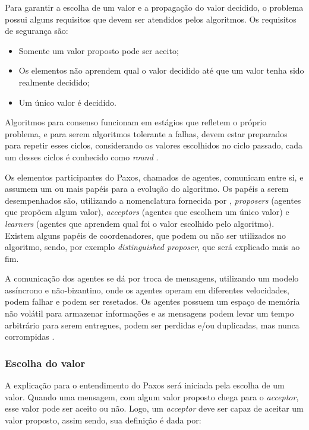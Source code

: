 \documentclass[
    12pt,
    openright, 
    oneside,
    a4paper,
    french,
    english,
    brazil
    ]{facom-ufu-abntex2}
\theoremstyle{definition}
\begin{document}
Para garantir a escolha de um valor e a propagação do valor decidido, o problema
possui alguns requisitos que devem ser atendidos pelos algoritmos. Os requisitos de
segurança são:

\begin{itemize}
    \item Somente um valor proposto pode ser aceito;
    \item Os elementos não aprendem qual o valor decidido até que um valor 
    tenha sido realmente decidido;
    \item Um único valor é decidido.
\end{itemize}

Algoritmos para consenso funcionam em estágios que refletem o próprio problema, e para
serem algoritmos tolerante a falhas, devem estar preparados para repetir esses ciclos,
considerando os valores escolhidos no ciclo passado, cada um desses ciclos é conhecido como
\emph{round} \cite{camargos2008multicoordinated}.

Os elementos participantes do Paxos, chamados de agentes, comunicam entre si, e assumem 
um ou mais papéis para a evolução do algoritmo. Os papéis a serem desempenhados são, 
utilizando a nomenclatura fornecida por \cite{lamport2001paxos}, 
\emph{proposers} (agentes que propõem algum valor), \emph{acceptors} 
(agentes que escolhem um único valor) e \emph{learners} (agentes que aprendem
qual foi o valor escolhido pelo algoritmo).
Existem alguns papéis de coordenadores, que podem ou não ser utilizados no algoritmo, 
sendo, por exemplo \emph{distinguished proposer}, que será explicado mais ao fim.

A comunicação dos agentes se dá por troca de mensagens, utilizando um modelo assíncrono e
não-bizantino, onde os agentes operam em diferentes velocidades, podem falhar e podem ser
resetados. Os agentes possuem um espaço de memória não volátil para armazenar informações e
as mensagens podem levar um tempo arbitrário para serem entregues, podem ser perdidas e/ou 
duplicadas, mas nunca corrompidas \cite{lamport2001paxos}.

\subsubsection{Escolha do valor}
A explicação para o entendimento do Paxos será iniciada pela escolha de um valor. 
Quando uma mensagem, com algum valor proposto chega para o \emph{acceptor}, esse valor pode 
ser aceito ou não. Logo, um \emph{acceptor} deve ser capaz de aceitar um valor proposto, 
assim sendo, sua definição é dada por:
\end{document}
